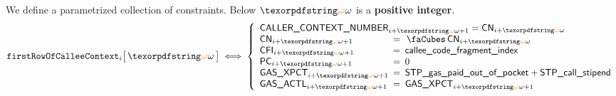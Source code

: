 We define a parametrized collection of constraints. Below $\relof$ is a \textbf{positive integer}. 
\[
	\firstRowOfCallee {i}{\relof}
	\iff
	\left\{ \begin{array}{lcl}
		\multicolumn{3}{l}{\caller  _{i + \relof + 1}          =          \cn  _{i + \relof}} \\
		\cn                         _{i + \relof + 1} & \!\!\! = \!\!\! & \cnCn_{i + \relof}                 \\
		\cfi                        _{i + \relof + 1} & \!\!\! = \!\!\! & \locCalleeCfi                      \\
		\pc                         _{i + \relof + 1} & \!\!\! = \!\!\! & 0                                  \\
		\gasExpected                _{i + \relof + 1} & \!\!\! = \!\!\! & \locStpGasPoop + \locStpGasStipend \\
		\gasActual                  _{i + \relof + 1} & \!\!\! = \!\!\! & \gasExpected   _{i + \relof + 1}   \\
	\end{array} \right.
\]

